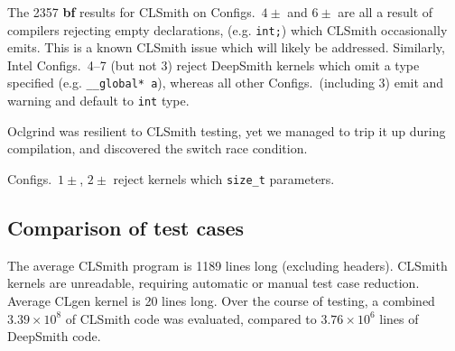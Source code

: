 
The 2357 \textbf{bf} results for CLSmith on Configs.\ $4\pm$ and $6\pm$ are all a result of compilers rejecting empty declarations, (e.g. \texttt{int;}) which CLSmith occasionally emits. This is a known CLSmith issue which will likely be addressed.
Similarly, Intel Configs.\ 4--7 (but not 3) reject DeepSmith kernels which omit a type specified (e.g. \texttt{\_\_global* a}), whereas all other Configs.\ (including 3) emit and warning and default to \texttt{int} type.


Oclgrind was resilient to CLSmith testing, yet we managed to trip it up during compilation, and discovered the switch race condition.

Configs.\ $1\pm$, $2\pm$ reject kernels which \texttt{size\_t} parameters.


\subsection{Comparison of test cases}

The average CLSmith program is 1189 lines long (excluding headers). CLSmith kernels are unreadable, requiring automatic or manual test case reduction.
Average CLgen kernel is 20 lines long.
Over the course of testing, a combined $3.39 \times 10^8$ of CLSmith code was evaluated, compared to $3.76 \times 10^6$ lines of DeepSmith code.

